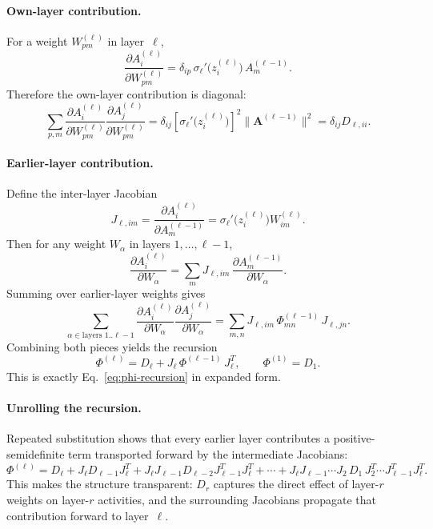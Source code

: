 \documentclass[10pt]{article}
\newcommand{\vA}{\mathbf{A}}
\begin{document}
\paragraph{Own-layer contribution.}
For a weight $W_{pm}^{(\ell)}$ in layer~$\ell$,
\[
  \frac{\partial A_i^{(\ell)}}{\partial W_{pm}^{(\ell)}}
  =
  \delta_{ip}\,\sigma_\ell'\!\bigl(z_i^{(\ell)}\bigr)\,A_m^{(\ell-1)}.
\]
Therefore the own-layer contribution is diagonal:
\[
  \sum_{p,m}
  \frac{\partial A_i^{(\ell)}}{\partial W_{pm}^{(\ell)}}
  \frac{\partial A_j^{(\ell)}}{\partial W_{pm}^{(\ell)}}
  =
  \delta_{ij}[\sigma_\ell'\!\bigl(z_i^{(\ell)}\bigr)]^2 \lVert \vA^{(\ell-1)} \rVert^2
  =
  \delta_{ij} D_{\ell,ii}.
\]

\paragraph{Earlier-layer contribution.}
Define the inter-layer Jacobian
\[
  J_{\ell,im} = \frac{\partial A_i^{(\ell)}}{\partial A_m^{(\ell-1)}}
  =
  \sigma_\ell'\!\bigl(z_i^{(\ell)}\bigr) W_{im}^{(\ell)}.
\]
Then for any weight $W_\alpha$ in layers $1,\dots,\ell-1$,
\[
  \frac{\partial A_i^{(\ell)}}{\partial W_\alpha}
  =
  \sum_m J_{\ell,im}\,\frac{\partial A_m^{(\ell-1)}}{\partial W_\alpha}.
\]
Summing over earlier-layer weights gives
\[
  \sum_{\alpha\in\text{layers }1..\ell-1}
  \frac{\partial A_i^{(\ell)}}{\partial W_\alpha}
  \frac{\partial A_j^{(\ell)}}{\partial W_\alpha}
  =
  \sum_{m,n} J_{\ell,im}\,\Phi_{mn}^{(\ell-1)}\,J_{\ell,jn}.
\]
Combining both pieces yields the recursion
\[
  \Phi^{(\ell)} = D_\ell + J_\ell \,\Phi^{(\ell-1)}\, J_\ell^T,
  \qquad
  \Phi^{(1)} = D_1.
\]
This is exactly Eq.~\eqref{eq:phi-recursion} in expanded form.

\paragraph{Unrolling the recursion.}
Repeated substitution shows that every earlier layer contributes a positive-semidefinite term transported forward by the intermediate Jacobians:
\[
  \Phi^{(\ell)}
  =
  D_\ell
  + J_\ell D_{\ell-1} J_\ell^T
  + J_\ell J_{\ell-1} D_{\ell-2} J_{\ell-1}^T J_\ell^T
  + \cdots
  + J_\ell J_{\ell-1} \cdots J_2\, D_1\, J_2^T \cdots J_{\ell-1}^T J_\ell^T.
\]
This makes the structure transparent: $D_r$ captures the direct effect of layer-$r$ weights on layer-$r$ activities, and the surrounding Jacobians propagate that contribution forward to layer~$\ell$.
\end{document}
